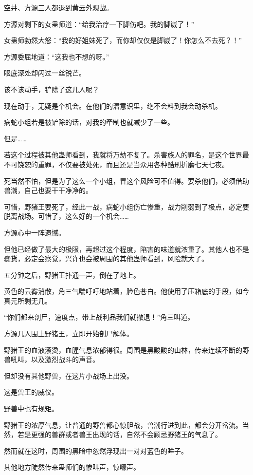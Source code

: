 \begin{this_body}
空井、方源三人都退到黄云外观战。

方源对剩下的女蛊师道：“给我治疗一下脚伤吧。我的脚崴了！”

女蛊师勃然大怒：“我的好姐妹死了，而你却仅仅是脚崴了！你怎么不去死？！”

方源委屈地道：“这我也不想的呀。”

眼底深处却闪过一丝锐芒。

该不该动手，铲除了这几人呢？

现在动手，无疑是个机会。在他们的潜意识里，绝不会料到我会动杀机。

病蛇小组若是被铲除的话，对我的牵制也就减少了一些。

但是……

若这个过程被其他蛊师看到，我就将万劫不复了。杀害族人的罪名，是这个世界最不可饶恕的重罪，不仅要被处死，而且还是当众用各种酷刑折磨七天七夜。

死当然不怕，但是为了这么一个小组，冒这个风险可不值得。要杀他们，必须借助兽潮，自己也要干干净净的。

可惜，野猪王要死了，经此一战，病蛇小组伤亡惨重，战力削弱到了极点，必定要脱离战场。可惜了，这么好的一个机会……

方源心中一阵遗憾。

但他已经做了最大的极限，再超过这个程度，陷害的味道就浓重了。其他人也不是蠢货，必定会察觉，兴许也会被周围的其他蛊师看到，风险就大了。

五分钟之后，野猪王扑通一声，倒在了地上。

黄色的云雾消散，角三气喘吁吁地站着，脸色苍白。他使用了压箱底的手段，如今真元所剩无几。

“你们都来剖尸，速度点，带上战利品我们就撤退！”角三叫道。

方源几人围上野猪王，立即开始剖尸解体。

野猪王的血液滚烫，血腥气息浓郁得很。周围是黑黢黢的山林，传来连续不断的野兽吼叫，以及激烈战斗的声音。

但却没有其他野兽，在这片小战场上出没。

这是兽王的威仪。

野兽中也有规矩。

野猪王的浓厚气息，让普通的野兽都心惊胆战，兽潮行进到此，都会分开岔流。当然，若是更强的兽群或者兽王出现的话，自然不会顾忌野猪王的气息了。

然而就在这时，周围的黑暗中忽然浮现出一对对蓝色的眸子。

其他地方陡然传来蛊师们的惨叫声，惊嚎声。


\end{this_body}
